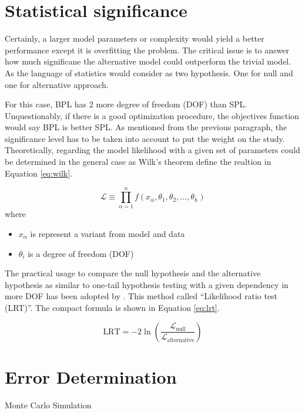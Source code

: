 \section{Statistical significance}

Certainly, a larger model parameters or complexity would yield 
a better performance except it is overfitting the problem.
The critical issue is to answer how much significane the alternative 
model could outperform the trivial model. As the language of statistics 
would consider as two hypothesis. One for null and one for alternative 
approach. 

For this case, BPL has 2 more degree of freedom (DOF) than SPL.
Unquestionably, if there is a good optimization procedure, 
the objectives function would say BPL is better SPL. As mentioned 
from the previous paragraph, the significance level has to be taken
into account to put the weight on the study. Theoretically, regarding 
the model likelihood with a given set of parameters could be determined 
in the general case as Wilk's theorem define the realtion in 
Equation \ref{eq:wilk}.

\begin{equation}
    \mathcal{L} \equiv \prod_{\alpha=1}^n f(x_\alpha, \theta_1, \theta_2, ..., \theta_h)
    \label{eq:wilk}
\end{equation}
where 
\begin{itemize}
    \item $x_\alpha$ is represent a variant from model and data
    \item $\theta_i$ is a degree of freedom (DOF)
\end{itemize}

The practical usage to compare the null hypothesis and the alternative 
hypothesis as similar to one-tail hypothesis testing with a given 
dependency in more DOF has been adopted by \cite{Huelsenbeck}.
This method called ``Likelihood ratio test (LRT)''. The compact formula 
is shown in Equation \ref{eq:lrt}.

\begin{equation}
    \text{LRT} = -2\ln\left(\frac{\mathcal{L}_\text{null}}{\mathcal{L}_\text{alternative}}\right)
    \label{eq:lrt}
\end{equation}


\section{Error Determination}

Monte Carlo Simulation





